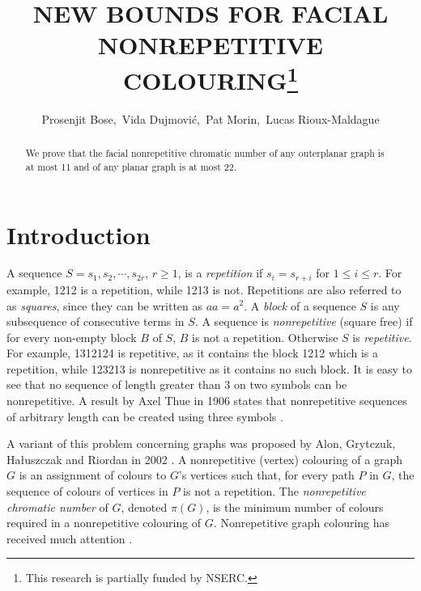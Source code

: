 \documentclass{patmorin}
\title{\MakeUppercase{New Bounds for Facial Nonrepetitive Colouring}\thanks{This research is partially funded by NSERC.}}
\author{Prosenjit Bose,\, Vida Dujmovi\'c,\, Pat Morin,\, Lucas Rioux-Maldague}
\begin{document}
\maketitle


\begin{abstract}
  We prove that the facial nonrepetitive chromatic number of any outerplanar graph is at most 11 and of any planar graph is at most 22.
\end{abstract}


\section{Introduction}
A sequence $S=s_1,s_2,\cdots,s_{2r}$, $r\ge 1$, is a \emph{repetition}
if $s_i=s_{r+i}$ for $1 \leq i \leq r$. For example, 1212 is a
repetition, while 1213 is not. Repetitions are also referred to as
\emph{squares}, since they can be written as $aa=a^2$. A \emph{block}
of a sequence $S$ is any subsequence of consecutive terms in $S$. A
sequence is \emph{nonrepetitive} (square free) if for every non-empty
block $B$
of $S$, $B$ is not a repetition. Otherwise $S$ is \emph{repetitive}. For
example, 1312124 is repetitive, as it contains the block 1212 which is a
repetition, while 123213 is nonrepetitive as it contains no such block.
It is easy to see that no sequence of length greater than 3 on two symbols
can be nonrepetitive. A result by Axel Thue in 1906 states
that nonrepetitive sequences of arbitrary length can be created using
three symbols \cite{thue1906uber}. 

A variant of this problem concerning graphs was proposed by Alon,
Grytczuk, Ha{\l}uszczak and Riordan in 2002 \cite{alon2002nonrepetitive}.
A nonrepetitive (vertex) colouring of a graph $G$ is an assignment
of colours to $G$'s vertices such that, for every path $P$ in $G$,
the sequence of colours of vertices in $P$ is not a repetition.
The \emph{nonrepetitive chromatic number} of $G$, denoted $\pi(G)$,
is the minimum number of colours required in a nonrepetitive
colouring of $G$.  Nonrepetitive graph colouring has received much
attention \cite{barat2013facial, barat2007square, barat2008note,
brevsar2007nonrepetitive, currie2002cycle18, dujmovic2012planarlogn,
dujmovic2011nonrepetitive, fiorenzi2011thue, gagol2016pathwidth,
gonccalves2014entropy,
grytczuk2007nonrepetitivesurvey, grytczuk2007nonrepetitive,
grytczuk2013new, harant2012nonrepetitive, kozik2013nonrepetitive,
kundgen2008nonrepetitive, pezarski2009non, schreyer2012facial,
schreyer2013total}.
\end{document}
